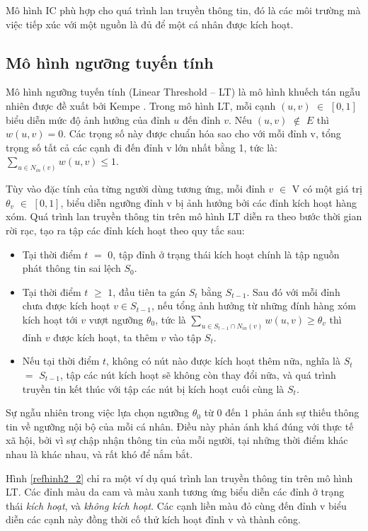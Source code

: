 	Mô hình IC phù hợp cho quá trình lan truyền thông tin, đó là các môi trường mà việc tiếp xúc với một nguồn là đủ để một cá nhân được kích hoạt.
	
	\subsection{Mô hình ngưỡng tuyến tính}
	Mô hình ngưỡng tuyến tính (Linear Threshold – LT) là mô hình khuếch tán ngẫu nhiên được đề xuất bởi Kempe \cite{kemple1}. Trong mô hình LT, mỗi cạnh $(u,v)$ $\in$ $[0,1]$ biểu diễn mức độ ảnh hưởng của đỉnh $u$ đến đỉnh $v$. Nếu $(u,v)$ $\notin$ $E$ thì $w(u,v)=0$. Các trọng số này được chuẩn hóa sao cho với mỗi đỉnh v, tổng trọng số tất cả các cạnh đi đến đỉnh v lớn nhất bằng 1, tức là: $\sum_{u\in N_{in}(v)}w(u,v) \leq 1.$ 
	
	Tùy vào đặc tính của từng người dùng tương ứng, mỗi đỉnh $v$ $\in$ V có một giá trị $\theta$$_{v}$ $\in$ $[0,1]$, biểu diễn ngưỡng đỉnh v bị ảnh hưởng bởi các đỉnh kích hoạt hàng xóm. Quá trình lan truyền thông tin trên mô hình LT diễn ra theo bước thời gian rời rạc, tạo ra tập các đỉnh kích hoạt theo quy tắc sau:
	\begin {itemize}
		\item Tại thời điểm $t$ $=$ $0$, tập đỉnh ở trạng thái kích hoạt chính là tập nguồn phát thông tin sai lệch $S$$_{0}$.
	
		\item Tại thời điểm $t$ $\geq$ $1$, đầu tiên ta gán $S$$_{t}$ bằng $S$$_{t-1}$. Sau đó với mỗi đỉnh chưa được kích hoạt $v \in S_{t-1}$, nếu tổng ảnh hưởng từ những đính hàng xóm kích hoạt tới $v$ vượt ngưỡng $\theta$$_{0}$, tức là  $\sum_{u\in S_{t-1} \cap N_{in}(v)}w(u,v) \geq \theta_{v}$ thì đỉnh $v$ được kích hoạt, ta thêm $v$ vào tập $S$$_{t}$.
	
		\item Nếu tại thời điểm $t$, không có nút nào được kích hoạt thêm nữa, nghĩa là $S$$_{t}$ $=$ $S$$_{t-1}$, tập các nút kích hoạt sẽ không còn thay đổi nữa, và quá trình truyền tin kết thúc với tập các nút bị kích hoạt cuối cùng là $S$$_{t}$.
	\end {itemize}
	
	Sự ngẫu nhiên trong việc lựa chọn ngưỡng $\theta$$_{0}$ từ $0$ đến $1$ phản ánh sự thiếu thông tin về ngưỡng nội bộ của mỗi cá nhân. Điều này phản ánh khá đúng với thực tế xã hội, bởi vì sự chập nhận thông tin của mỗi người, tại những thời điểm khác nhau là khác nhau, và rất khó để nắm bắt. 
	
	Hình \ref{refhinh2_2} chỉ ra một ví dụ quá trình lan truyền thông tin trên mô hình LT. Các đỉnh màu da cam và màu xanh tương ứng biểu diễn các đỉnh ở trạng thái {\itshape kích hoạt}, và {\itshape không kích hoạt}. Các cạnh liền màu đỏ cùng đến đỉnh v biểu diễn các cạnh này đồng thời cố thử kích hoạt đỉnh v và thành công.
	
